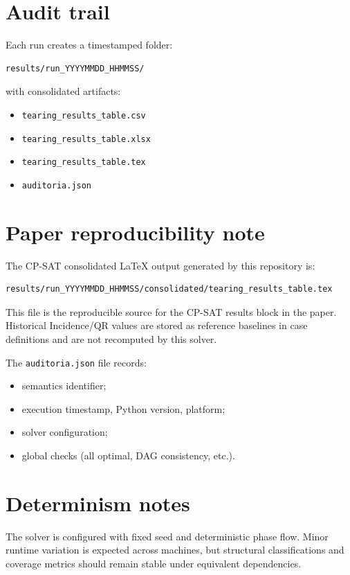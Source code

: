 \documentclass[11pt]{article}
\begin{document}
\section{Audit trail}
Each run creates a timestamped folder:
\begin{verbatim}
results/run_YYYYMMDD_HHMMSS/
\end{verbatim}
with consolidated artifacts:
\begin{itemize}
  \item \texttt{tearing\_results\_table.csv}
  \item \texttt{tearing\_results\_table.xlsx}
  \item \texttt{tearing\_results\_table.tex}
  \item \texttt{auditoria.json}
\end{itemize}

\section{Paper reproducibility note}
The CP-SAT consolidated LaTeX output generated by this repository is:
\begin{verbatim}
results/run_YYYYMMDD_HHMMSS/consolidated/tearing_results_table.tex
\end{verbatim}
This file is the reproducible source for the CP-SAT results block in the paper.
Historical Incidence/QR values are stored as reference baselines in case
definitions and are not recomputed by this solver.

The \texttt{auditoria.json} file records:
\begin{itemize}
  \item semantics identifier;
  \item execution timestamp, Python version, platform;
  \item solver configuration;
  \item global checks (all optimal, DAG consistency, etc.).
\end{itemize}

\section{Determinism notes}
The solver is configured with fixed seed and deterministic phase flow. Minor
runtime variation is expected across machines, but structural classifications
and coverage metrics should remain stable under equivalent dependencies.
\end{document}
